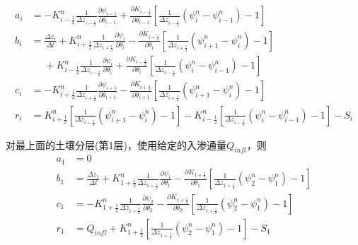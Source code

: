 \begin{equation}
\begin{aligned}
 a_i &= - K_{i-\frac{1}{2}}^{n} \frac{1}{\Delta z_{i-\frac{1}{2}}}
     \frac{\partial \psi_{i-1}}{\partial \theta_{i-1}}+\frac{\partial K_{i-\frac{1}{2}}}
     {\partial \theta_{i-1}}\left[\frac{1}{\Delta z_{i-\frac{1}{2}}}\left(\psi_{i}^{n}-\psi_{i-1}^{n}\right)-1\right] \\
b_i &= \frac{\Delta z_{i}}{\Delta t}+K_{i+\frac{1}{2}}^{n} \frac{1}{\Delta z_{i+\frac{1}{2}}} 
      \frac{\partial \psi_{i}}{\partial \theta_{i}}-\frac{\partial K_{i+\frac{1}{2}}}{\partial \theta_{i}}
      \left[\frac{1}{\Delta z_{i+\frac{1}{2}}}\left(\psi_{i+1}^{n}-\psi_{i}^{n}\right)-1\right] \\
&\mathrel{\phantom{=}}+K_{i-\frac{1}{2}}^{n} \frac{1}{\Delta z_{i-\frac{1}{2}}} \frac{\partial \psi_{i}}{\partial 
       \theta_{i}}+\frac{\partial K_{i-\frac{1}{2}}}{\partial \theta_{i}}\left[\frac{1}{\Delta z_{i-\frac{1}{2}}}\left(\psi_{i}^{n}-\psi_{i-1}^{n}\right)-1\right] \\ 
c_i &= - K_{i+\frac{1}{2}}^{n} \frac{1}{\Delta z_{i+\frac{1}{2}}} 
       \frac{\partial \psi_{i+1}}{\partial \theta_{i+1}} - \frac{\partial K_{i+\frac{1}{2}}}{\partial \theta_{i+1}}\left[\frac{1}
       {\Delta z_{i+\frac{1}{2}}}\left(\psi_{i+1}^{n}-\psi_{i}^{n}\right)-1\right] \\ 
r_i &= K_{i+\frac{1}{2}}^{n}
       \left[\frac{1}{\Delta z_{i+\frac{1}{2}}}\left(\psi_{i+1}^{n}-\psi_{i}^{n}\right)-1\right] - K_{i-\frac{1}{2}}^{n}
       \left[\frac{1}{\Delta z_{i-\frac{1}{2}}}\left(\psi_{i}^{n}-\psi_{i-1}^{n}\right)-1\right]-S_{i}
\end{aligned}
\end{equation}

对最上面的土壤分层(第1层)，使用给定的入渗通量$Q_{infl}$，则
\begin{equation}
\begin{aligned}
a_1 &= 0 \\
b_1 &= \frac{\Delta z_1}{\Delta t}+K_{1+\frac{1}{2}}^{n} 
    \frac{1}{\Delta z_{1+\frac{1}{2}}} \frac{\partial \psi_{1}}{\partial \theta_{1}}-\frac{\partial K_{1+\frac{1}{2}}}{\partial \theta_{1}}\left[\frac{1}{\Delta z_{1+\frac{1}{2}}}
    \left(\psi_{2}^{n}-\psi_{1}^{n}\right)-1\right] \\
c_1 &= -K_{1+\frac{1}{2}}^{n} \frac{1}{\Delta z_{1+\frac{1}{2}}} 
    \frac{\partial \psi_{2}}{\partial \theta_{2}}-\frac{\partial K_{1+\frac{1}{2}}}{\partial \theta_{2}}\left[\frac{1}{\Delta z_{1+\frac{1}{2}}}
    \left(\psi_{2}^{n}-\psi_{1}^{n}\right)-1\right] \\ 
r_1 &= Q_{infl}+K_{1+\frac{1}{2}}^{n}
    \left[\frac{1}{\Delta z_{1+\frac{1}{2}}}\left(\psi_{2}^{n}-\psi_{1}^{n}\right)-1\right]-S_{1}
\end{aligned}
\end{equation}

